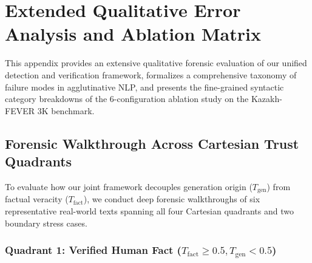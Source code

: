 \chapter{Extended Qualitative Error Analysis and Ablation Matrix}
\label{app:error_cases}

This appendix provides an extensive qualitative forensic evaluation of our unified detection and verification framework, formalizes a comprehensive taxonomy of failure modes in agglutinative NLP, and presents the fine-grained syntactic category breakdowns of the 6-configuration ablation study on the Kazakh-FEVER 3K benchmark.

\section{Forensic Walkthrough Across Cartesian Trust Quadrants}
\label{sec:app_error_quadrants}

To evaluate how our joint framework decouples generation origin ($T_{\text{gen}}$) from factual veracity ($T_{\text{fact}}$), we conduct deep forensic walkthroughs of six representative real-world texts spanning all four Cartesian quadrants and two boundary stress cases.

\subsection{Quadrant 1: Verified Human Fact \texorpdfstring{($T_{\text{fact}} \ge 0.5, T_{\text{gen}} < 0.5$)}{(T-fact >= 0.5, T-gen < 0.5)}}
\label{sec:app_case_q1}

